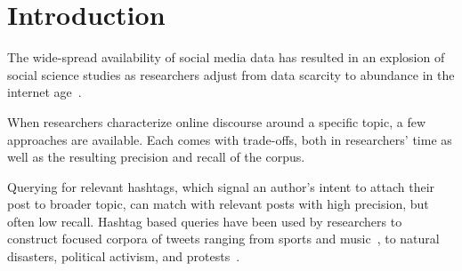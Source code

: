 

\section{Introduction}
\label{sec:corpusCreation.introduction}




The wide-spread availability of social media data
has resulted in an explosion of social science studies
as researchers adjust
from data scarcity
to abundance
in the internet age~\cite{lazer2009computational,lazer2021meaningful}. 






When researchers characterize online discourse around a specific topic, a few approaches are available.
Each comes with trade-offs, both in researchers' time as well as the resulting precision and recall of the corpus.

Querying for relevant hashtags,
which signal an author's intent to attach their post to broader topic,
can match with relevant posts with high precision,
but often low recall.  
Hashtag based queries have been used by researchers
to construct focused corpora of tweets ranging from sports and music~\cite{blaszka2012worldseries,choi2014south},
to natural disasters, political activism, and
protests~\cite{steinert2015online,lotan2011arab,freelon2016beyond,jackson2020hashtagactivism,gallagher2019reclaiming,gallagher2018divergent,gorodnichenko2021social,arnold2021hurricanes}.

